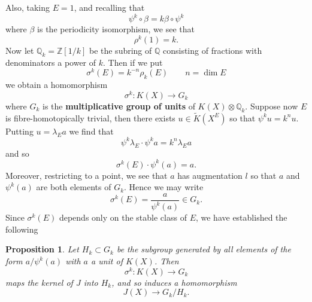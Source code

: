 \documentclass[leqno]{book}
\numberwithin{equation}{section}
\newtheorem{proposition}[theorem]{Proposition}
\theoremstyle{definition}
\renewcommand{\emph}{\textbf}
\begin{document}
            Also, taking $E=1$, and recalling that 
            \begin{equation*}
              \psi^{k}\circ \beta=k\beta\circ \psi^{k}
            \end{equation*}
            where $\beta$ is the periodicity isomorphism, we see that
            \begin{equation*}
              \rho^{k}(1)=k.
            \end{equation*}
            Now let $\mathbb{Q}_{k}=\mathbb{Z}[1/k]$ be the subring of $\mathbb{Q}$ consisting of fractions with denominators a power of $k$. Then if we put 
            \begin{equation*}
              \sigma^{k}(E)=k^{-n}\rho_{k}(E) \qquad n=\operatorname{dim}E
            \end{equation*}
            we obtain a homomorphism
            \begin{equation*}
              \sigma^{k}:K(X)\to G_{k}
            \end{equation*}
            where $G_{k}$ is the \emph{multiplicative group of units} of $K(X)\otimes \mathbb{Q}_{k}$. Suppose now $E$ is fibre-homotopically trivial, then there exists $u \in \tilde{K}(X^{E})$ so that $\psi^{k}u=k^{n}u$. Putting $u=\lambda_{E}a$ we find that 
            \begin{equation*}
              \psi^{k}\lambda_{E}\cdot \psi^{k}a=k^{n}\lambda_{E}a 
            \end{equation*}
            and so 
            \begin{equation*}
              \sigma^{k}(E)\cdot \psi^{k}(a)=a.
            \end{equation*}
            Moreover, restricting to a point, we see that $a$ has augmentation $l$ so that $a$ and $\psi^{k}(a)$ are both elements of $G_{k}$. Hence we may write
            \begin{equation*}
              \sigma^{k}(E)=\frac{a}{\psi^{k}(a)} \in G_{k}.
            \end{equation*}
            Since $\sigma ^{k}(E)$ depends only on the stable class of $E$, we have established the following

            \begin{proposition}
              Let $H_{k} \subset G_{k}$ be the subgroup generated by all elements of the form $a/\psi^{k}(a)$ with  $a$ a unit of $K(X)$. Then
              \begin{equation*}
                \sigma^{k}:K(X)\to G_{k}
              \end{equation*}
              maps the kernel of $J$ into $H_{k}$, and so induces a homomorphism
              \begin{equation*}
                J(X)\to G_{k}/H_{k}.
              \end{equation*}
            \end{proposition}
\end{document}
